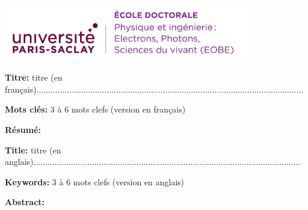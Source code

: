 \documentclass[french,12pt,a4paper]{book}
\begin{document}
\ifthispageodd{\newpage\thispagestyle{empty}\null\newpage}{}
\thispagestyle{empty}
\selectfont

\lhead{}
\rhead{}
\rfoot{}
\cfoot{}
\lfoot{}

\noindent 
\includegraphics[height=2.45cm]{EOBE}
\vspace{1cm}
\selectfont

\small

\begin{mdframed}[linecolor=Prune,linewidth=1]
	
	\textbf{Titre:} titre (en français)..................................................................................................................
	
	\noindent \textbf{Mots clés:} 3 à 6 mots clefs (version en français)
	
	\vspace{-.5cm}
	\begin{multicols}{2}
		\noindent \textbf{Résumé:}\lipsum[1-2] 
	\end{multicols}
	
\end{mdframed}

\vspace{8mm}

\begin{mdframed}[linecolor=Prune,linewidth=1]
	
	\textbf{Title:} titre (en anglais)..................................................................................................................
	
	\noindent \textbf{Keywords:} 3 à 6 mots clefs (version en anglais)
	
	\begin{multicols}{2}
		\noindent \textbf{Abstract:} \lipsum[1-2]
	\end{multicols}
\end{mdframed}
\end{document}
